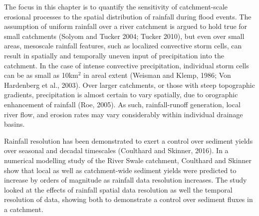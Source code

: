 The focus in this chapter is to quantify the sensitivity of catchment-scale erosional processes to the spatial distribution of rainfall during flood events. The assumption of uniform rainfall over a river catchment is argued to hold true for small catchments (Solyom and Tucker 2004; Tucker 2010), but even over small areas, mesoscale rainfall features, such as localized convective storm cells, can result in spatially and temporally uneven input of precipitation into the catchment. In the case of intense convective precipitation, individual storm cells can be as small as 10km$^2$ in areal extent (Weisman and Klemp, 1986; Von Hardenberg et al., 2003). Over larger catchments, or those with steep topographic gradients, precipitation is almost certain to vary spatially, due to orographic enhancement of rainfall (Roe, 2005). As such, rainfall-runoff generation, local river flow, and erosion rates may vary considerably within individual drainage basins. 

Rainfall resolution has been demonstrated to exert a control over sediment yields over seasonal and decadal timescales (Coulthard and Skinner, 2016). In a numerical modelling study of the River Swale catchment, Coulthard and Skinner show that local as well as catchment-wide sediment yields were predicted to increase by orders of magnitude as rainfall data resolution increases. The study looked at the effects of rainfall spatial data resolution as well the temporal resolution of data, showing both to demonstrate a control over sediment fluxes in a catchment. 


